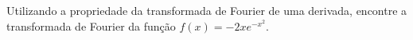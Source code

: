 \linespread{1.5}
Utilizando a propriedade da transformada de Fourier de uma derivada, encontre a transformada de Fourier da função $f(x) = -2xe^{-x^2}$.